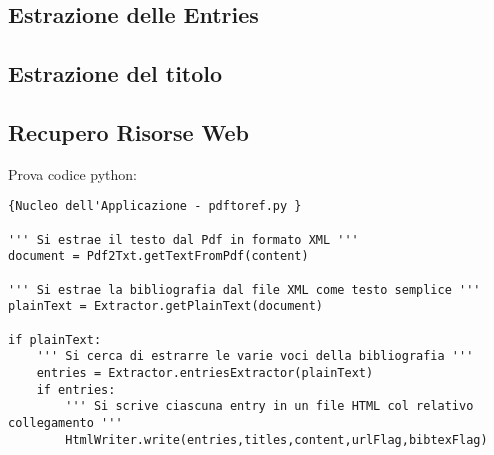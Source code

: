 \subsection{Estrazione delle Entries}

\subsection{Estrazione del titolo}

\subsection{Recupero Risorse Web}


Prova codice python:


\begin{lstlisting}[frame=r,caption=Nucleo dell'Applicazione - pdftoref.py ,breaklines=true,basicstyle=\small]{Nucleo dell'Applicazione - pdftoref.py }

''' Si estrae il testo dal Pdf in formato XML '''
document = Pdf2Txt.getTextFromPdf(content)

''' Si estrae la bibliografia dal file XML come testo semplice '''
plainText = Extractor.getPlainText(document)

if plainText:
	''' Si cerca di estrarre le varie voci della bibliografia '''
	entries = Extractor.entriesExtractor(plainText)
	if entries:
		''' Si scrive ciascuna entry in un file HTML col relativo collegamento '''
		HtmlWriter.write(entries,titles,content,urlFlag,bibtexFlag)

\end{lstlisting}
